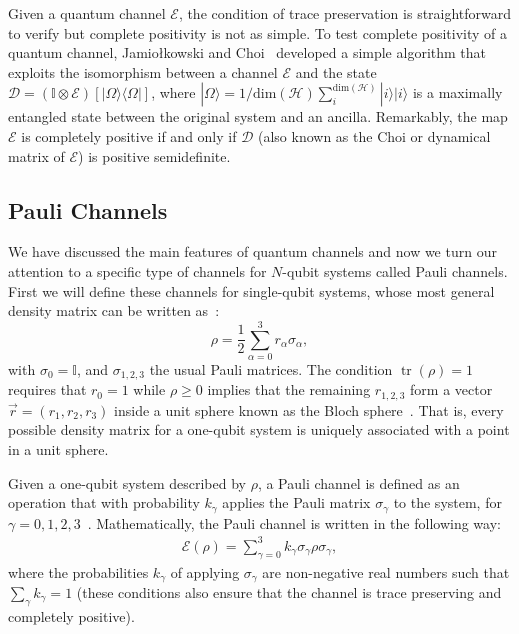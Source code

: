 \documentclass[10pt,letterpaper]{article} %
\DeclareMathOperator{\tr}{tr}
\begin{document}
Given a quantum channel $\mathcal{E}$, the condition of trace preservation is
straightforward to verify but complete positivity is not as simple.  To test
complete positivity of a quantum channel, Jamiołkowski and
Choi~\cite{choi,jamil} developed a simple algorithm that exploits the
isomorphism between a channel $\mathcal{E}$ and the state $\mathcal{D} =
(\mathbb{I} \otimes \mathcal{E}) [|\Omega \rangle \langle  \Omega|]$, where
$|\Omega\rangle = 1/\text{dim}(\mathcal{H}) \sum_{i}^{\text{dim}(\mathcal{H})}
|i \rangle |i \rangle$ is a maximally entangled state between the original
system and an ancilla.  Remarkably, the map $\mathcal{E}$ is completely
positive if and only if $\mathcal{D}$ (also known as the Choi or dynamical
matrix of $\mathcal{E}$) is positive semidefinite.

\subsection{Pauli Channels}  \label{subsec: Pauli Channels} %

We have discussed the main features of quantum channels and 
now we turn our attention to a specific 
type of channels for $N$-qubit systems called Pauli channels.
First we will define these channels for single-qubit systems,
whose most general density matrix can be written as~\cite{chuangbook}:
\begin{equation}
\label{eq: Density Matrix}
\rho = \dfrac{1}{2} \sum_{\alpha=0}^{3} r_{\alpha} \sigma_{\alpha},
\end{equation}
with $\sigma_0 = \mathbb{I}$, and $\sigma_{1,2,3}$ the usual Pauli matrices.
The condition $\tr(\rho) = 1$ requires that $r_0 = 1$ while $\rho \geq 0$ 
implies that the remaining $r_{1,2,3}$ form
a vector $\vec{r}= (r_1,r_2,r_3)$ inside a unit sphere known as the Bloch sphere~\cite{Marinescu}.
That is, every possible density matrix for a one-qubit
system is uniquely associated with a point in a unit sphere. 

Given a one-qubit system described by $\rho$, 
a Pauli channel is defined as an operation that with probability $k_{\gamma}$
applies the Pauli matrix $\sigma_{\gamma}$ to
the system, for $\gamma = 0,1,2,3$~\cite{geometry}.
Mathematically, the Pauli channel is written in the following way:
\begin{eqnarray}
\label{eq: Pauli channel 1 qbit}
\mathcal{E}(\rho) = \sum_{\gamma=0}^3 k_{\gamma} \sigma_{\gamma} \rho \sigma_{\gamma},
\end{eqnarray} 
where the probabilities $k_{\gamma}$ of applying $\sigma_{\gamma}$
are non-negative real numbers such that 
$\sum_{\gamma} k_{\gamma} = 1$ (these conditions also ensure that the channel is 
trace preserving and completely positive).
\end{document}
